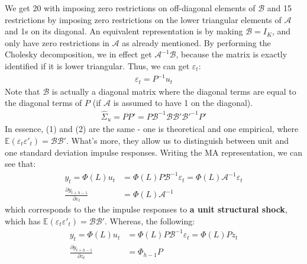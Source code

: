 \documentclass[a4paper, 12pt]{article}
\begin{document}
We get 20 with imposing zero restrictions on off-diagonal elements of $\mathcal{B}$ and 15 restrictions by imposing zero restrictions on the lower triangular elements of $\mathcal{A}$ and 1s on its diagonal. An equivalent representation is by making $\mathcal{B}=I_K$, and only have zero restrictions in $\mathcal{A}$ as already mentioned. 
By performing the Cholesky decomposition, we in effect get $\mathcal{A}^{-1}\mathcal{B}$, because the matrix is exactly identified if it is lower triangular. Thus, we can get $\varepsilon_t$:
\begin{equation}
\begin{aligned}
\varepsilon_t=P^{-1}u_t \nonumber
\end{aligned}
\end{equation}
Note that $\mathcal{B}$ is actually a diagonal matrix where the diagonal terms are equal to the diagonal terms of $P$ (if $\mathcal{A}$ is assumed to have 1 on the diagonal).
\begin{equation}
\begin{aligned}
\hat{\Sigma}_u=PP'=P\mathcal{B}^{-1}\mathcal{B}\mathcal{B}'\mathcal{B}'^{-1}P' 
\end{aligned}
\end{equation}
In essence, (1) and (2) are the same - one is theoretical and one empirical, where $\mathbb{E}(\varepsilon_t\varepsilon'_t)=\mathcal{B}\mathcal{B}'$. What's more, they allow us to distinguish between unit and one standard deviation impulse responses. Writing the MA representation, we can see that:
\begin{equation}
\begin{aligned}
y_t=\Phi(L)u_{t}&=\Phi(L)P\mathcal{B}^{-1}\varepsilon_t=\Phi(L)\mathcal{A}^{-1}\varepsilon_t\nonumber \\
\frac{\partial y_{t+h-1}}{\partial \varepsilon_{t}}&=\Phi(L)\mathcal{A}^{-1} \nonumber
\end{aligned}
\end{equation}
which corresponds to the the impulse responses to \textbf{a unit structural shock}, which has $\mathbb{E}(\varepsilon_t\varepsilon'_t)=\mathcal{B}\mathcal{B}'$. Whereas, the following:
\begin{equation}
\begin{aligned}
y_t=\Phi(L)u_{t}&=\Phi(L)P\mathcal{B}^{-1}\varepsilon_t=\Phi(L)Pz_t\nonumber \\
\frac{\partial y_{t+h-1}}{\partial z_{t}}&=\Phi_{h-1}P \nonumber
\end{aligned}
\end{equation}
\end{document}
